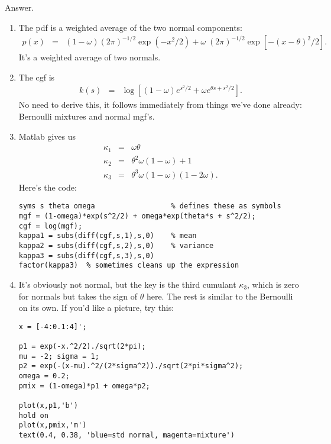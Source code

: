 \documentclass[11pt]{article}
\begin{document}
\begin{enumerate}
Answer.
\begin{enumerate}
\item The pdf is a weighted average of the two normal components:
\begin{eqnarray*}
        p(x) &=& (1-\omega) (2 \pi)^{-1/2} \exp(-x^2/2) +
            \omega \; (2 \pi)^{-1/2} \exp[-(x-\theta)^2/2 ].
\end{eqnarray*}
It's a weighted average of two normals.
\item The cgf is
\begin{eqnarray*}
    k(s) &=&  \log \left[ (1-\omega) e^{s^2/2}
                + \omega  e^{\theta s + s^2/2} \right].
\end{eqnarray*}
No need to derive this, it follows immediately from things we've done already:
Bernoulli mixtures and normal mgf's.
\item Matlab gives us
\begin{eqnarray*}
    \kappa_1 &=& \omega \theta \\
    \kappa_2 &=& \theta^2 \omega (1-\omega) + 1 \\
    \kappa_3 &=& \theta^3 \omega (1-\omega) (1-2\omega) .
\end{eqnarray*}
Here's the code:
\begin{verbatim}
syms s theta omega                  % defines these as symbols
mgf = (1-omega)*exp(s^2/2) + omega*exp(theta*s + s^2/2);
cgf = log(mgf);
kappa1 = subs(diff(cgf,s,1),s,0)    % mean
kappa2 = subs(diff(cgf,s,2),s,0)    % variance
kappa3 = subs(diff(cgf,s,3),s,0)
factor(kappa3)  % sometimes cleans up the expression
\end{verbatim}
\item It's obviously not normal, but the key is the third cumulant $\kappa_3$,
which is zero for normals
but takes the sign of $\theta$ here.
The rest is similar to the Bernoulli on its own.
If you'd like a picture, try this:
\begin{verbatim}
x = [-4:0.1:4]';

p1 = exp(-x.^2/2)./sqrt(2*pi);
mu = -2; sigma = 1;
p2 = exp(-(x-mu).^2/(2*sigma^2))./sqrt(2*pi*sigma^2);
omega = 0.2;
pmix = (1-omega)*p1 + omega*p2;

plot(x,p1,'b')
hold on
plot(x,pmix,'m')
text(0.4, 0.38, 'blue=std normal, magenta=mixture')
\end{verbatim}
\end{enumerate}



\end{enumerate}
\end{document}

